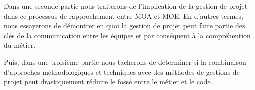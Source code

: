 \documentclass[12pt]{article}
\begin{document}
Dans une seconde partie nous traiterons de l'implication de la gestion de projet dans ce processus de rapprochement entre MOA et MOE. En d'autres termes, nous essayerons de démontrer en quoi la gestion de projet peut faire partie des clés de la communication entre les équipes et par conséquent à la compréhention du métier. 

Puis, dans une troisième partie nous tacherons de déterminer si la combinaison d'approches méthodologiques et techniques avec des méthodes de gestions de projet peut drastiquement réduire le fossé entre le métier et le code.



\cite{dahman}
\cite{processus}
\cite{ddd}
\cite{domain}

\printbibliography
\end{document}

